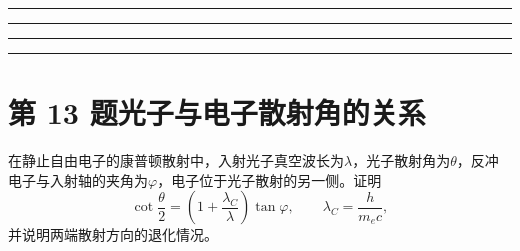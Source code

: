 \documentclass[UTF8,fontset=fandol,a4paper,11pt]{ctexart}
\newcommand{\workarea}{\par\vspace{7mm}\noindent{\small\color{muted}作答区}\par\vspace{4mm}
\noindent\textcolor{rulegray}{\rule{\linewidth}{0.3pt}}\par\vspace{16mm}
\noindent\textcolor{rulegray}{\rule{\linewidth}{0.3pt}}\par\vspace{16mm}
\noindent\textcolor{rulegray}{\rule{\linewidth}{0.3pt}}\par\vspace{16mm}
\noindent\textcolor{rulegray}{\rule{\linewidth}{0.3pt}}}
\begin{document}
\workarea

\clearpage


\section*{第 13 题\quad 光子与电子散射角的关系}\label{q:13}

在静止自由电子的康普顿散射中，入射光子真空波长为$\lambda$，光子散射角为$\theta$，反冲电子与入射轴的夹角为$\varphi$，电子位于光子散射的另一侧。证明
\[
\cot\frac\theta2=\left(1+\frac{\lambda_C}{\lambda}\right)\tan\varphi,
\qquad \lambda_C=\frac h{m_ec},
\]
并说明两端散射方向的退化情况。

\begin{center}\begin{minipage}{.98\linewidth}\centering
\begin{tikzpicture}[scale=.9,transform shape]

\end{tikzpicture}
\end{minipage}
\end{center}
\end{document}
